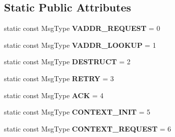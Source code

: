 \subsection*{Static Public Attributes}
\begin{DoxyCompactItemize}
\item 
\hypertarget{structgraybat_1_1communicationPolicy_1_1ZMQ_a75693f5486b00722fde46828a370a3e1}{}static const Msg\+Type {\bfseries V\+A\+D\+D\+R\+\_\+\+R\+E\+Q\+U\+E\+S\+T} = 0\label{structgraybat_1_1communicationPolicy_1_1ZMQ_a75693f5486b00722fde46828a370a3e1}

\item 
\hypertarget{structgraybat_1_1communicationPolicy_1_1ZMQ_ac9a6d846b671d488ccc2b48a213cb65c}{}static const Msg\+Type {\bfseries V\+A\+D\+D\+R\+\_\+\+L\+O\+O\+K\+U\+P} = 1\label{structgraybat_1_1communicationPolicy_1_1ZMQ_ac9a6d846b671d488ccc2b48a213cb65c}

\item 
\hypertarget{structgraybat_1_1communicationPolicy_1_1ZMQ_aa5fff922697df13ba51ab9c211125561}{}static const Msg\+Type {\bfseries D\+E\+S\+T\+R\+U\+C\+T} = 2\label{structgraybat_1_1communicationPolicy_1_1ZMQ_aa5fff922697df13ba51ab9c211125561}

\item 
\hypertarget{structgraybat_1_1communicationPolicy_1_1ZMQ_a3ebabd8f81881cd6ca82083da5912dc0}{}static const Msg\+Type {\bfseries R\+E\+T\+R\+Y} = 3\label{structgraybat_1_1communicationPolicy_1_1ZMQ_a3ebabd8f81881cd6ca82083da5912dc0}

\item 
\hypertarget{structgraybat_1_1communicationPolicy_1_1ZMQ_ae738003867ad7590787fbd72e470a0c7}{}static const Msg\+Type {\bfseries A\+C\+K} = 4\label{structgraybat_1_1communicationPolicy_1_1ZMQ_ae738003867ad7590787fbd72e470a0c7}

\item 
\hypertarget{structgraybat_1_1communicationPolicy_1_1ZMQ_a0fa73b38f80d3d2d2761b014ffd64410}{}static const Msg\+Type {\bfseries C\+O\+N\+T\+E\+X\+T\+\_\+\+I\+N\+I\+T} = 5\label{structgraybat_1_1communicationPolicy_1_1ZMQ_a0fa73b38f80d3d2d2761b014ffd64410}

\item 
\hypertarget{structgraybat_1_1communicationPolicy_1_1ZMQ_a36274d861cda1c40bf2cd384f359ac36}{}static const Msg\+Type {\bfseries C\+O\+N\+T\+E\+X\+T\+\_\+\+R\+E\+Q\+U\+E\+S\+T} = 6\label{structgraybat_1_1communicationPolicy_1_1ZMQ_a36274d861cda1c40bf2cd384f359ac36}


\end{DoxyCompactItemize}
